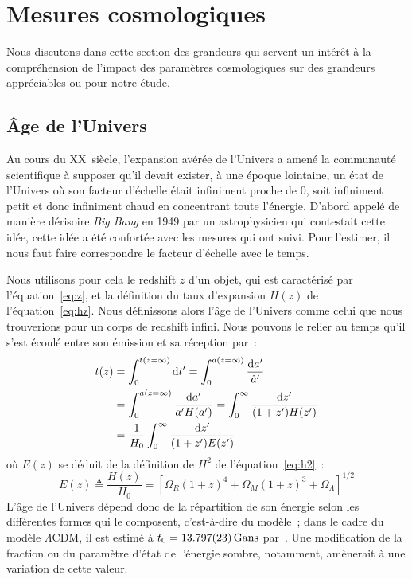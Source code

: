 \documentclass[../main/main.tex]{subfiles}
\begin{document}
\section{Mesures cosmologiques}\label{sec:dist}

Nous discutons dans cette section des grandeurs qui servent un intérêt à la
compréhension de l'impact des paramètres cosmologiques sur des grandeurs
appréciables ou pour notre étude.

\subsection{Âge de l'Univers}\label{ssec:age}

Au cours du XX\ieme~siècle, l'expansion avérée de l'Univers a amené la
communauté scientifique à supposer qu'il devait exister, à une époque lointaine,
un état de l'Univers où son facteur d'échelle était infiniment proche de 0, soit
infiniment petit et donc infiniment chaud en concentrant toute l'énergie.
D'abord appelé de manière dérisoire \textit{Big Bang} en 1949 par un
astrophysicien qui contestait cette idée, cette idée a été confortée avec les
mesures qui ont suivi. Pour l'estimer, il nous faut faire correspondre le
facteur d'échelle avec le temps.

Nous utilisons pour cela le redshift $z$ d'un objet, qui est caractérisé par
l'équation~\ref{eq:z}, et la définition du taux d'expansion $H(z)$ de
l'équation~\ref{eq:hz}. Nous définissons alors l'âge de l'Univers comme celui
que nous trouverions pour un corps de redshift infini. Nous pouvons le relier au
temps qu'il s'est écoulé entre son émission et sa réception par~:
\begin{align}
    t(z) & = \int_{0}^{t(z=\infty)} \mathrm{d} t' = \int_{0}^{a(z=\infty)} \frac{\mathrm{d} a'}{\dot{a}'}
    \nonumber\\
         & = \int_{0}^{a(z=\infty)} \frac{\mathrm{d} a'}{a'H(a')} = \int_{0}^{\infty} \frac{\mathrm{d}
         z'}{(1+z')H(z')}\nonumber\\
         & = \frac{1}{H_0} \int_{0}^{\infty} \frac{\mathrm{d} z'}{(1+z')E(z')}
\end{align}
où $E(z)$ se déduit de la définition de $H^2$ de l'équation~\ref{eq:h2}~:
\begin{equation}\label{eq:ez}
    E(z) \triangleq \frac{H(z)}{H_0} = \left[ \Omega_R(1+z)^4 + \Omega_M(1+z)^3
    + \Omega_\Lambda\right]^{1/2}
\end{equation}
L'âge de l'Univers dépend donc de la répartition de son énergie selon les
différentes formes qui le composent, c'est-à-dire du modèle~; dans le cadre du
modèle $\Lambda$CDM, il est estimé à $t_0 = \SI{13.797\pm0.023}{Gans}$
par~\cite{planck2018}. Une modification de la fraction ou du paramètre d'état de
l'énergie sombre, notamment, amènerait à une variation de cette valeur.
\end{document}
